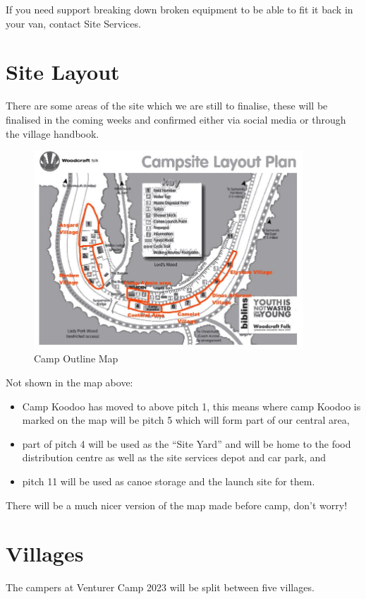 \documentclass[a4paper, 11pt]{report}
\begin{document}
If you need support breaking down broken equipment to be able to fit it back in your van, contact Site Services.

\chapter{Site Layout}
There are some areas of the site which we are still to finalise, these will be finalised in the coming weeks and confirmed either via social media or through the village handbook. 
\begin{figure}[H]
    \centering
    \includegraphics[width=0.9\textwidth]{camp-map-v1.jpg}
    \caption{Camp Outline Map}
\end{figure}
Not shown in the map above:
\begin{itemize}
    \item Camp Koodoo has moved to above pitch 1, this means where camp Koodoo is marked on the map will be pitch 5 which will form part of our central area,
    \item part of pitch 4 will be used as the ``Site Yard'' and will be home to the food distribution centre as well as the site services depot and car park, and
    \item pitch 11 will be used as canoe storage and the launch site for them. 
\end{itemize}

There will be a much nicer version of the map made before camp, don't worry!

\chapter{Villages}
The campers at Venturer Camp 2023 will be split between five villages.
\end{document}

